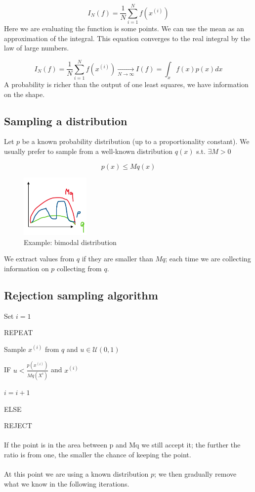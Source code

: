 $$
I_N(f)=\frac{1}{N} \sum^N_{i=1} f(x^{(i)})
$$
\noindent
Here we are evaluating the function is some points. We can use the mean
as an approximation of the integral. This equation converges to the real
integral by the law of large numbers.

$$
I_N(f)=\frac{1}{N} \sum^N_{i=1} f(x^{(i)})  \xrightarrow[N \rightarrow \infty  ]{}   I(f)= \int_x f(x)p(x)dx
$$
\noindent
A probability is richer than the output of one least squares, we have
information on the shape.


\subsection{Sampling a distribution}

Let $p$ be a known probability distribution (up to a proportionality
constant). We usually prefer to sample from a well-known distribution
$q(x)$ s.t. $\exists M>0$

$$
p(x) \leq M q(x)
$$


\begin{figure}
\centering
\includegraphics[width=0.3\textwidth]{distribution.png}
\caption{Example: bimodal distribution}
\end{figure}
\noindent
We extract values from $q$ if they are smaller than $Mq$; each time we
are collecting information on $p$ collecting from $q$.

\subsection{Rejection sampling algorithm}

Set $i=1$

REPEAT

Sample $x^{(i)}$ from $q$ and $u \in \mathcal{U}(0,1)$

IF $u < \frac{p(x^{(i)})}{Mq(X^i)}$ and $x^{(i)}$

$i=i+1$

ELSE

REJECT
\\
\\
\noindent
If the point is in the area between p and Mq we still accept it; the
further the ratio is from one, the smaller the chance of keeping the
point.
\\
\\
\noindent
At this point we are using a known distribution $p$; we then gradually
remove what we know in the following iterations.


